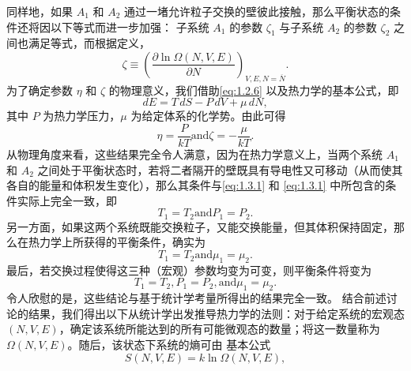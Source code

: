 同样地，如果 \(A_{1}\) 和 \(A_{2}\) 通过一堵允许粒子交换的壁彼此接触，那么平衡状态的条件还将因以下等式而进一步加强：
子系统 \(A_{1}\) 的参数 \(\zeta_{1}\) 与子系统 \(A_{2}\) 的参数 \(\zeta_{2}\) 之间也满足等式，而根据定义，
\begin{equation}\tag{1.3.4}\label{eq:1.3.4}
\zeta \equiv \left( \frac { \partial \ln \Omega ( N , V , E ) } { \partial N } \right) _ { V , E , N = \overline { { { N } } } } .
\end{equation}
为了确定参数 \(\eta\) 和 \(\zeta\) 的物理意义，我们借助\autoref{eq:1.2.6} 以及热力学的基本公式，即
\begin{equation}\tag{1.3.5}\label{eq:1.3.5}
d E = T \, d S - P \, d V + \mu \, d N ,
\end{equation}
其中 \(P\) 为热力学压力，\(\mu\) 为给定体系的化学势。由此可得
\begin{equation}\tag{1.3.6}\label{eq:1.3.6}
\eta = \frac { P } { k T }  \mathrm { a n d }  \zeta = - \frac { \mu } { k T } .
\end{equation}
从物理角度来看，这些结果完全令人满意，因为在热力学意义上，当两个系统 \(A_{1}\) 和 \(A_{2}\) 之间处于平衡状态时，若将二者隔开的壁既具有导电性又可移动（从而使其各自的能量和体积发生变化），那么其条件与\autoref{eq:1.3.1} 和 \autoref{eq:1.3.1} 中所包含的条件实际上完全一致，即
\begin{equation}\tag{1.3.7}\label{eq:1.3.7}
T _ { 1 } = T _ { 2 }  \mathrm { a n d }  P _ { 1 } = P _ { 2 } .
\end{equation}
另一方面，如果这两个系统既能交换粒子，又能交换能量，但其体积保持固定，那么在热力学上所获得的平衡条件，确实为
\begin{equation}\tag{1.3.8}\label{eq:1.3.8}
T _ { 1 } = T _ { 2 }  \mathrm { a n d }  \mu _ { 1 } = \mu _ { 2 } .
\end{equation}
最后，若交换过程使得这三种（宏观）参数均变为可变，则平衡条件将变为
\begin{equation}\tag{1.3.9}\label{eq:1.3.9}
T _ { 1 } = T _ { 2 } ,  P _ { 1 } = P _ { 2 } ,  \mathrm { a n d }  \mu _ { 1 } = \mu _ { 2 } .
\end{equation}
令人欣慰的是，这些结论与基于统计学考量所得出的结果完全一致。
结合前述讨论的结果，我们得出以下从统计学出发推导热力学的法则：对于给定系统的宏观态 \((N,V,E)\)，确定该系统所能达到的所有可能微观态的数量；将这一数量称为 \(\Omega(N,V,E)\)。随后，该状态下系统的熵可由
基本公式
\begin{equation}\tag{1.3.10}\label{eq:1.3.10}
S ( N , V , E ) = k \ln \Omega ( N , V , E ) ,
\end{equation}
